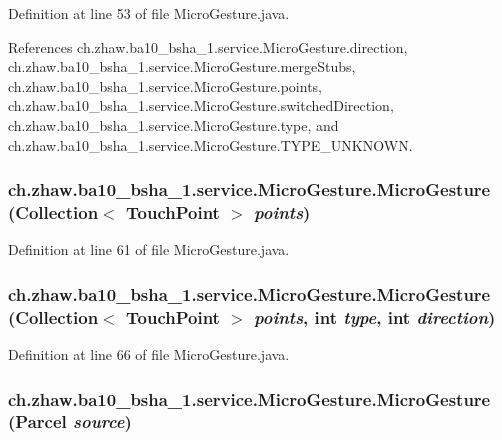 Definition at line 53 of file MicroGesture.java.

References ch.zhaw.ba10\_\-bsha\_\-1.service.MicroGesture.direction, ch.zhaw.ba10\_\-bsha\_\-1.service.MicroGesture.mergeStubs, ch.zhaw.ba10\_\-bsha\_\-1.service.MicroGesture.points, ch.zhaw.ba10\_\-bsha\_\-1.service.MicroGesture.switchedDirection, ch.zhaw.ba10\_\-bsha\_\-1.service.MicroGesture.type, and ch.zhaw.ba10\_\-bsha\_\-1.service.MicroGesture.TYPE\_\-UNKNOWN.\hypertarget{classch_1_1zhaw_1_1ba10__bsha__1_1_1service_1_1MicroGesture_aef999428ccd948a1f401fff6b3787735}{
\subsubsection[{MicroGesture}]{\setlength{\rightskip}{0pt plus 5cm}ch.zhaw.ba10\_\-bsha\_\-1.service.MicroGesture.MicroGesture (Collection$<$ {\bf TouchPoint} $>$ {\em points})}}
\label{classch_1_1zhaw_1_1ba10__bsha__1_1_1service_1_1MicroGesture_aef999428ccd948a1f401fff6b3787735}


Definition at line 61 of file MicroGesture.java.\hypertarget{classch_1_1zhaw_1_1ba10__bsha__1_1_1service_1_1MicroGesture_a96957bab62119263b061869d4caf6d18}{
\subsubsection[{MicroGesture}]{\setlength{\rightskip}{0pt plus 5cm}ch.zhaw.ba10\_\-bsha\_\-1.service.MicroGesture.MicroGesture (Collection$<$ {\bf TouchPoint} $>$ {\em points}, \/  int {\em type}, \/  int {\em direction})}}
\label{classch_1_1zhaw_1_1ba10__bsha__1_1_1service_1_1MicroGesture_a96957bab62119263b061869d4caf6d18}


Definition at line 66 of file MicroGesture.java.\hypertarget{classch_1_1zhaw_1_1ba10__bsha__1_1_1service_1_1MicroGesture_a915edd1a693527b48678802234a9d37d}{
\subsubsection[{MicroGesture}]{\setlength{\rightskip}{0pt plus 5cm}ch.zhaw.ba10\_\-bsha\_\-1.service.MicroGesture.MicroGesture (Parcel {\em source})}}
\label{classch_1_1zhaw_1_1ba10__bsha__1_1_1service_1_1MicroGesture_a915edd1a693527b48678802234a9d37d}


